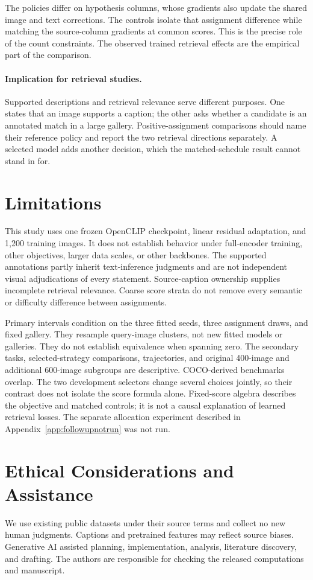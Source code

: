 \documentclass[11pt]{article}
\begin{document}
The policies differ on hypothesis columns, whose gradients also update the shared image and text corrections. The controls isolate that assignment difference while matching the source-column gradients at common scores. This is the precise role of the count constraints. The observed trained retrieval effects are the empirical part of the comparison.

\paragraph{Implication for retrieval studies.}
Supported descriptions and retrieval relevance serve different purposes. One states that an image supports a caption; the other asks whether a candidate is an annotated match in a large gallery. Positive-assignment comparisons should name their reference policy and report the two retrieval directions separately. A selected model adds another decision, which the matched-schedule result cannot stand in for.

\clearpage
\section*{Limitations}
This study uses one frozen OpenCLIP checkpoint, linear residual adaptation, and 1,200 training images. It does not establish behavior under full-encoder training, other objectives, larger data scales, or other backbones. The supported annotations partly inherit text-inference judgments and are not independent visual adjudications of every statement. Source-caption ownership supplies incomplete retrieval relevance. Coarse score strata do not remove every semantic or difficulty difference between assignments.

Primary intervals condition on the three fitted seeds, three assignment draws, and fixed gallery. They resample query-image clusters, not new fitted models or galleries. They do not establish equivalence when spanning zero. The secondary tasks, selected-strategy comparisons, trajectories, and original 400-image and additional 600-image subgroups are descriptive. COCO-derived benchmarks overlap. The two development selectors change several choices jointly, so their contrast does not isolate the score formula alone. Fixed-score algebra describes the objective and matched controls; it is not a causal explanation of learned retrieval losses. The separate allocation experiment described in Appendix~\ref{app:followupnotrun} was not run.

\section*{Ethical Considerations and Assistance}
We use existing public datasets under their source terms and collect no new human judgments. Captions and pretrained features may reflect source biases. Generative AI assisted planning, implementation, analysis, literature discovery, and drafting. The authors are responsible for checking the released computations and manuscript.


\appendix
\raggedbottom





\end{document}
